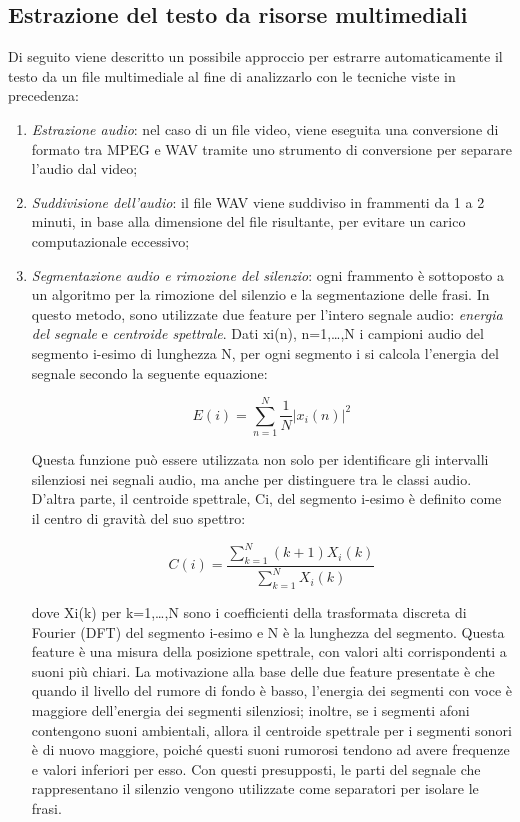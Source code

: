 \subsection{Estrazione del testo da risorse multimediali}
Di seguito viene descritto un possibile approccio per estrarre automaticamente il testo da un file multimediale al fine di analizzarlo con le tecniche viste in precedenza\cite{video}:
\begin{enumerate}
\item \textit{Estrazione audio}: nel caso di un file video, viene eseguita una conversione di formato tra MPEG e WAV tramite uno strumento di conversione per separare l'audio dal video;
\item \textit{Suddivisione dell'audio}: il file WAV viene suddiviso in frammenti da 1 a 2 minuti, in base alla dimensione del file risultante, per evitare un carico computazionale eccessivo;
\item \textit{Segmentazione audio e rimozione del silenzio}: ogni frammento è sottoposto a un algoritmo per la rimozione del silenzio e la segmentazione delle frasi. In questo metodo, sono utilizzate due feature per l'intero segnale audio: \textit{energia del segnale} e \textit{centroide spettrale}. Dati xi(n), n=1,…,N i campioni audio del segmento i-esimo di lunghezza N, per ogni segmento i si calcola l'energia del segnale secondo la seguente equazione:

\begin{equation}
E(i) = \sum^{N}_{n=1} \frac{1}{N}| x_i (n)|^{2}
\end{equation}

Questa funzione può essere utilizzata non solo per identificare gli intervalli silenziosi nei segnali audio, ma anche per distinguere tra le classi audio. D'altra parte, il centroide spettrale, Ci, del segmento i-esimo è definito come il centro di gravità del suo spettro:

\begin{equation}
C(i) = \frac{\sum^{N}_{k=1}(k+1)X_i (k)}{\sum^{N}_{k=1}X_i (k)}
\end{equation}

dove Xi(k) per k=1,…,N sono i coefficienti della trasformata discreta di Fourier (DFT) del segmento i-esimo e N è la lunghezza del segmento. Questa feature è una misura della posizione spettrale, con valori alti corrispondenti a suoni più chiari.
La motivazione alla base delle due feature presentate è che quando il livello del rumore di fondo è basso, l'energia dei segmenti con voce è maggiore dell'energia dei segmenti silenziosi; inoltre, se i segmenti afoni contengono suoni ambientali, allora il centroide spettrale per i segmenti sonori è di nuovo maggiore, poiché questi suoni rumorosi tendono ad avere frequenze e valori inferiori per esso. Con questi presupposti, le parti del segnale che rappresentano il silenzio vengono utilizzate come separatori per isolare le frasi.


\end{enumerate}
